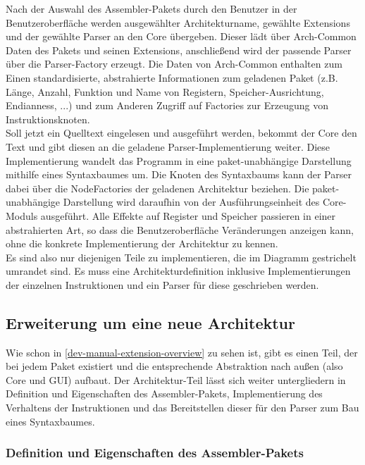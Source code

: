 Nach der Auswahl des Assembler-Pakets durch den Benutzer in der
Benutzeroberfläche werden ausgewählter Architekturname, gewählte Extensions und
der gewählte Parser an den Core übergeben. Dieser lädt über Arch-Common Daten
des Pakets und seinen Extensions, anschließend wird der passende Parser über die
Parser-Factory erzeugt. Die Daten von Arch-Common enthalten zum Einen
standardisierte, abstrahierte Informationen zum geladenen Paket (z.B. Länge,
Anzahl, Funktion und Name von Registern, Speicher-Ausrichtung, Endianness, ...)
und zum Anderen Zugriff auf Factories zur Erzeugung von Instruktionsknoten.\\
Soll jetzt ein Quelltext eingelesen und ausgeführt werden, bekommt der Core den
Text und gibt diesen an die geladene Parser-Implementierung weiter. Diese
Implementierung wandelt das Programm in eine paket-unabhängige Darstellung
mithilfe eines Syntaxbaumes um. Die Knoten des Syntaxbaums kann der Parser dabei
über die NodeFactories der geladenen Architektur beziehen. Die
paket-unabhängige Darstellung wird daraufhin von der Ausführungseinheit des Core-Moduls ausgeführt. Alle Effekte
auf Register und Speicher passieren in einer abstrahierten Art, so dass die
Benutzeroberfläche Veränderungen anzeigen kann, ohne die konkrete
Implementierung der Architektur zu kennen.\\

Es sind also nur diejenigen Teile zu implementieren, die im Diagramm gestrichelt
umrandet sind. Es muss eine Architekturdefinition inklusive Implementierungen
der einzelnen Instruktionen und ein Parser für diese geschrieben werden.

\subsection{Erweiterung um eine neue Architektur}

Wie schon in \autoref{dev-manual-extension-overview} zu sehen ist, gibt es einen
Teil, der bei jedem Paket existiert und die entsprechende Abstraktion nach außen
(also Core und GUI) aufbaut. Der Architektur-Teil lässt sich weiter
untergliedern in Definition und Eigenschaften des Assembler-Pakets,
Implementierung des Verhaltens der Instruktionen und das Bereitstellen dieser
für den Parser zum Bau eines Syntaxbaumes.

\subsubsection{Definition und Eigenschaften des Assembler-Pakets}

